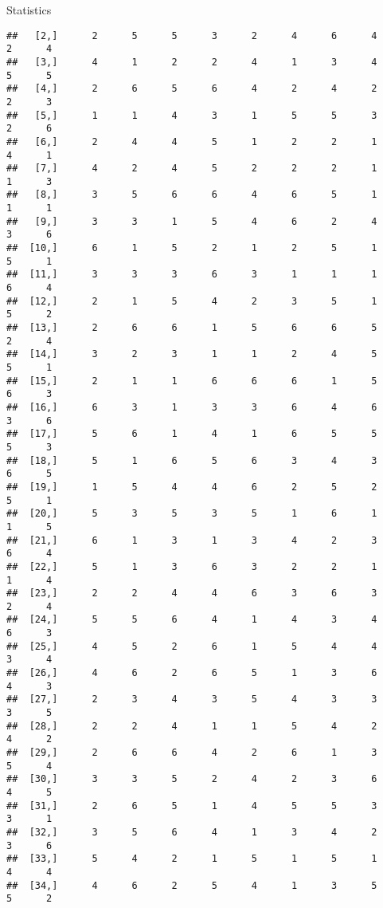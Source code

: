 \documentclass[
  ignorenonframetext,
]{beamer}
\begin{document}
\begin{frame}[fragile]{Statistics}
\begin{verbatim}
##   [2,]      2      5      5      3      2      4      6      4      2      4
##   [3,]      4      1      2      2      4      1      3      4      5      5
##   [4,]      2      6      5      6      4      2      4      2      2      3
##   [5,]      1      1      4      3      1      5      5      3      2      6
##   [6,]      2      4      4      5      1      2      2      1      4      1
##   [7,]      4      2      4      5      2      2      2      1      1      3
##   [8,]      3      5      6      6      4      6      5      1      1      1
##   [9,]      3      3      1      5      4      6      2      4      3      6
##  [10,]      6      1      5      2      1      2      5      1      5      1
##  [11,]      3      3      3      6      3      1      1      1      6      4
##  [12,]      2      1      5      4      2      3      5      1      5      2
##  [13,]      2      6      6      1      5      6      6      5      2      4
##  [14,]      3      2      3      1      1      2      4      5      5      1
##  [15,]      2      1      1      6      6      6      1      5      6      3
##  [16,]      6      3      1      3      3      6      4      6      3      6
##  [17,]      5      6      1      4      1      6      5      5      5      3
##  [18,]      5      1      6      5      6      3      4      3      6      5
##  [19,]      1      5      4      4      6      2      5      2      5      1
##  [20,]      5      3      5      3      5      1      6      1      1      5
##  [21,]      6      1      3      1      3      4      2      3      6      4
##  [22,]      5      1      3      6      3      2      2      1      1      4
##  [23,]      2      2      4      4      6      3      6      3      2      4
##  [24,]      5      5      6      4      1      4      3      4      6      3
##  [25,]      4      5      2      6      1      5      4      4      3      4
##  [26,]      4      6      2      6      5      1      3      6      4      3
##  [27,]      2      3      4      3      5      4      3      3      3      5
##  [28,]      2      2      4      1      1      5      4      2      4      2
##  [29,]      2      6      6      4      2      6      1      3      5      4
##  [30,]      3      3      5      2      4      2      3      6      4      5
##  [31,]      2      6      5      1      4      5      5      3      3      1
##  [32,]      3      5      6      4      1      3      4      2      3      6
##  [33,]      5      4      2      1      5      1      5      1      4      4
##  [34,]      4      6      2      5      4      1      3      5      5      2

\end{verbatim}
\end{frame}
\end{document}
